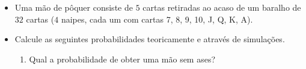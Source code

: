 \documentclass[
  11pt]{report}
\begin{document}
\begin{itemize}
\item
  Uma mão de pôquer consiste de $5$ cartas retiradas ao acaso de um baralho de $32$ cartas ($4$ naipes, cada um com cartas 7, 8, 9, 10, J, Q, K, A).
\item
  Calcule as seguintes probabilidades teoricamente e através de simulações.

  \begin{enumerate}
  \def\labelenumi{\arabic{enumi}.}
  \item
    Qual a probabilidade de obter uma mão sem ases?

\end{enumerate}
\end{itemize}
\end{document}
